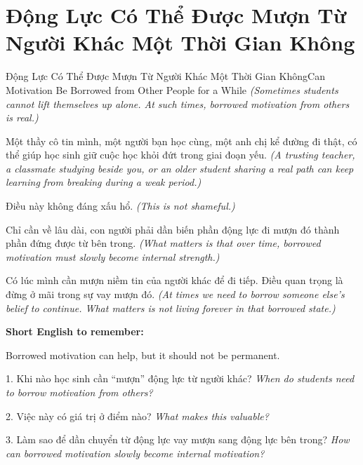 \section{Động Lực Có Thể Được Mượn Từ Người Khác Một Thời Gian Không}
\begin{truyen}{Động Lực Có Thể Được Mượn Từ Người Khác Một Thời Gian Không}{Can Motivation Be Borrowed from Other People for a While}
\textit{(Sometimes students cannot lift themselves up alone. At such times, borrowed motivation from others is real.)}

Một thầy cô tin mình, một người bạn học cùng, một anh chị kể đường đi thật, có thể giúp học sinh giữ cuộc học khỏi đứt trong giai đoạn yếu.
\textit{(A trusting teacher, a classmate studying beside you, or an older student sharing a real path can keep learning from breaking during a weak period.)}

Điều này không đáng xấu hổ.
\textit{(This is not shameful.)}

Chỉ cần về lâu dài, con người phải dần biến phần động lực đi mượn đó thành phần đứng được từ bên trong.
\textit{(What matters is that over time, borrowed motivation must slowly become internal strength.)}
\end{truyen}

\begin{baihoc}
Có lúc mình cần mượn niềm tin của người khác để đi tiếp. Điều quan trọng là đừng ở mãi trong sự vay mượn đó.
\textit{(At times we need to borrow someone else's belief to continue. What matters is not living forever in that borrowed state.)}
\end{baihoc}

\begin{ghinhoanh}
\textbf{Short English to remember:}

Borrowed motivation can help, but it should not be permanent.

\end{ghinhoanh}

\begin{tuhocnhanh}
1. Khi nào học sinh cần “mượn” động lực từ người khác? \textit{When do students need to borrow motivation from others?}

2. Việc này có giá trị ở điểm nào? \textit{What makes this valuable?}

3. Làm sao để dần chuyển từ động lực vay mượn sang động lực bên trong? \textit{How can borrowed motivation slowly become internal motivation?}
\end{tuhocnhanh}
\ngancach

